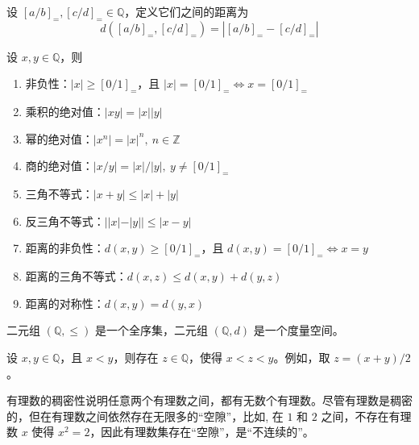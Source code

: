 \begin{definition}
    设 $[a/b]_{=},[c/d]_{=}\in\mathbb{Q}$，定义它们之间的距离为
    \[
        d([a/b]_{=},[c/d]_{=}) = |[a/b]_{=} - [c/d]_{=}|
    \]
\end{definition}

\vspace{1em}

\begin{theorem}[有理数绝对值的性质]
    设 $x,y\in\mathbb{Q}$，则
    \begin{enumerate}
        \item 非负性：$|x|\geq [0/1]_{=}$，且 $|x|=[0/1]_{=} \iff x=[0/1]_{=}$
        \item 乘积的绝对值：$|xy| = |x||y|$
        \item 幂的绝对值：$|x^n| = |x|^n,\ n\in\mathbb{Z}$
        \item 商的绝对值：$|x/y| = |x|/|y|,\ y\neq [0/1]_{=}$
        \item 三角不等式：$|x+y| \leq |x| + |y|$
        \item 反三角不等式：$||x| - |y|| \leq |x - y|$
        \item 距离的非负性：$d(x,y) \geq [0/1]_{=}$，且 $d(x,y)=[0/1]_{=} \iff x=y$
        \item 距离的三角不等式：$d(x,z) \leq d(x,y) + d(y,z)$
        \item 距离的对称性：$d(x,y) = d(y,x)$
    \end{enumerate}
\end{theorem}

\begin{note}
    二元组 $(\mathbb{Q},\leq)$ 是一个全序集，二元组 $(\mathbb{Q},d)$ 是一个度量空间。
\end{note}

\vspace{1em}

\begin{proposition}
    设 $x,y\in\mathbb{Q}$，且 $x<y$，则存在 $z\in\mathbb{Q}$，使得 $x<z<y$。例如，取 $z=(x+y)/2$。
\end{proposition}

\begin{note}
    有理数的稠密性说明任意两个有理数之间，都有无数个有理数。尽管有理数是稠密的，但在有理数之间依然存在无限多的“空隙”，比如, 在 $1$ 和 $2$ 之间，不存在有理数 $x$ 使得 $x^2=2$，因此有理数集存在“空隙”，是“不连续的”。
\end{note}
\vspace{1em}

\newpage